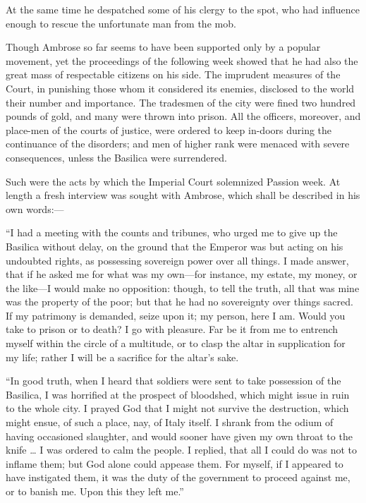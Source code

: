 At the same time he despatched some of his clergy to the spot, who
had influence enough to rescue the unfortunate man from the mob.

Though Ambrose so far seems to have been supported only by a
popular movement, yet the proceedings of the following week showed
that he had also the great mass of respectable citizens on his side.
The imprudent measures of the Court, in punishing those whom it
considered its enemies, disclosed to the world their number and
importance. The tradesmen of the city were fined two hundred pounds of
gold, and many were thrown into prison. All the officers, moreover,
and place-men of the courts of justice, were ordered to keep in-doors
during the continuance of the disorders; and men of higher rank were
menaced with severe consequences, unless the Basilica were
surrendered.

Such were the acts by which the Imperial Court solemnized Passion
week. At length a fresh interview was sought with Ambrose, which shall
be described in his own words:—

``I had a meeting with the counts and tribunes, who urged me to
give up the Basilica without delay, on the ground that the Emperor was
but acting on his undoubted rights, as possessing sovereign power over
all things. I made answer, that if he asked me for what was my own—for
instance, my estate, my money, or the like—I would make no
opposition: though, to tell the truth, all that was mine was the
property of the poor; but that he had no sovereignty over things
sacred. If my patrimony is demanded, seize upon it; my person, here I
am. Would you take to prison or to death? I go with pleasure. Far be
it from me to entrench myself within the circle of a multitude, or to
clasp the altar in supplication for my life; rather I will be a
sacrifice for the altar's sake.

``In good truth, when I heard that soldiers were sent to take
possession of the Basilica, I was horrified at the prospect of
bloodshed, which might issue in ruin to the whole city. I prayed God
that I might not survive the destruction, which might ensue, of such a
place, nay, of Italy itself. I shrank from the odium of having
occasioned slaughter, and would sooner have given my own throat to the
knife … I was ordered to calm the people. I replied, that all I
could do was not to inflame them; but God alone could appease them.
For myself, if I appeared to have instigated them, it was the duty of
the government to proceed against me, or to banish me. Upon this they
left me.''

